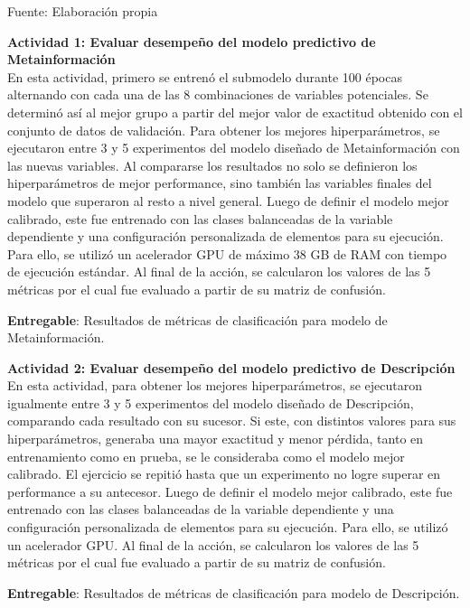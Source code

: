 \begin{flushleft}	%
	\small Fuente: Elaboración propia
\end{flushleft}

\textbf{Actividad 1: Evaluar desempeño del modelo predictivo de Metainformación}
\\
En esta actividad, primero se entrenó el submodelo durante 100 épocas alternando con cada una de las 8 combinaciones de variables potenciales. Se determinó así al mejor grupo a partir del mejor valor de exactitud obtenido con el conjunto de datos de validación. Para obtener los mejores hiperparámetros, se ejecutaron entre 3 y 5 experimentos del modelo diseñado de Metainformación con las nuevas variables. Al compararse los resultados no solo se definieron los hiperparámetros de mejor performance, sino también las variables finales del modelo que superaron al resto a nivel general. Luego de definir el modelo mejor calibrado, este fue entrenado con las clases balanceadas de la variable dependiente y una configuración personalizada de elementos para su ejecución. Para ello, se utilizó un acelerador GPU de máximo 38 GB de RAM con tiempo de ejecución estándar. Al final de la acción, se calcularon los valores de las 5 métricas por el cual fue evaluado a partir de su matriz de confusión.

\textbf{Entregable}: Resultados de métricas de clasificación para modelo de Metainformación.

\textbf{Actividad 2: Evaluar desempeño del modelo predictivo de Descripción}
\\
En esta actividad, para obtener los mejores hiperparámetros, se ejecutaron igualmente entre 3 y 5 experimentos del modelo diseñado de Descripción, comparando cada resultado con su sucesor. Si este, con distintos valores para sus hiperparámetros, generaba una mayor exactitud y menor pérdida, tanto en entrenamiento como en prueba, se le consideraba como el modelo mejor calibrado. El ejercicio se repitió hasta que un experimento no logre superar en performance a su antecesor. Luego de definir el modelo mejor calibrado, este fue entrenado con las clases balanceadas de la variable dependiente y una configuración personalizada de elementos para su ejecución. Para ello, se utilizó un acelerador GPU. Al final de la acción, se calcularon los valores de las 5 métricas por el cual fue evaluado a partir de su matriz de confusión.

\textbf{Entregable}: Resultados de métricas de clasificación para modelo de Descripción.

